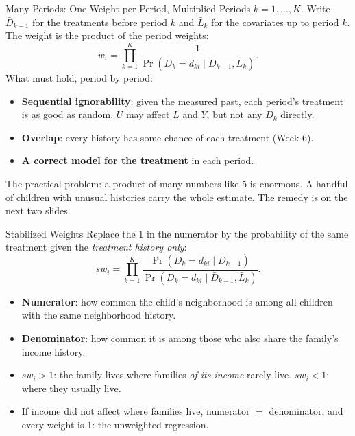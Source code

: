 \documentclass[aspectratio=169,11pt,xcolor=dvipsnames]{beamer}
\begin{document}
\begin{frame}{Many Periods: One Weight per Period, Multiplied}
Periods $k = 1, \dots, K$. Write $\bar D_{k-1}$ for the treatments before period $k$ and $\bar L_k$
for the covariates up to period $k$. The weight is the product of the period weights:
\[ w_i = \prod_{k=1}^{K} \frac{1}{\Pr(D_k = d_{ki} \mid \bar D_{k-1}, \bar L_k)} . \]
\vskip-4pt
What must hold, period by period:
\begin{itemize}\itemsep4pt
  \item \textbf{Sequential ignorability}: given the measured past, each period's treatment is as
        good as random. $U$ may affect $L$ and $Y$, but not any $D_k$ directly.
  \item \textbf{Overlap}: every history has some chance of each treatment (Week 6).
  \item \textbf{A correct model for the treatment} in each period.
\end{itemize}
\vskip4pt
The practical problem: a product of many numbers like 5 is enormous. A handful of children with
unusual histories carry the whole estimate. The remedy is on the next two slides.
\end{frame}

\begin{frame}{Stabilized Weights}
Replace the 1 in the numerator by the probability of the same treatment given the
\emph{treatment history only}:
\[ sw_i = \prod_{k=1}^{K}
   \frac{\Pr(D_k = d_{ki} \mid \bar D_{k-1})}{\Pr(D_k = d_{ki} \mid \bar D_{k-1}, \bar L_k)} . \]
\begin{itemize}\itemsep5pt
  \item \textbf{Numerator}: how common the child's neighborhood is among all children with the
        same neighborhood history.
  \item \textbf{Denominator}: how common it is among those who also share the family's income
        history.
  \item $sw_i > 1$: the family lives where families \emph{of its income} rarely live.
        $sw_i < 1$: where they usually live.
  \item If income did not affect where families live, numerator $=$ denominator, and every weight
        is 1: the unweighted regression.
\end{itemize}
\end{frame}
\end{document}
